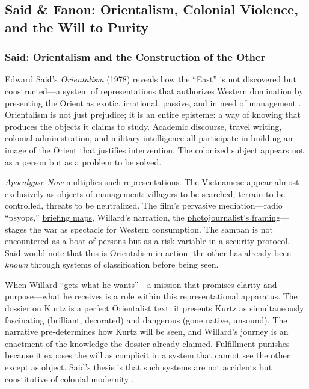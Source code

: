 \subsection*{Said \& Fanon: Orientalism, Colonial Violence, and the Will to Purity}
\label{ssec:v-said-fanon}

\subsubsection*{Said: Orientalism and the Construction of the Other}
Edward Said's \textit{Orientalism} (1978) reveals how the ``East'' is not discovered but
constructed---a system of representations that authorizes Western domination by presenting the
Orient as exotic, irrational, passive, and in need of management \parencite{SaidOrientalism1978}.
Orientalism is not just prejudice; it is an entire episteme: a way of knowing that produces the
objects it claims to study. Academic discourse, travel writing, colonial administration, and
military intelligence all participate in building an image of the Orient that justifies
intervention. The colonized subject appears not as a person but as a problem to be solved.

\textit{Apocalypse Now} multiplies such representations. The Vietnamese appear almost
exclusively as objects of management: villagers to be searched, terrain to be controlled,
threats to be neutralized. The film's pervasive mediation---radio ``psyops,''
\hyperref[scene:briefing]{briefing maps}, Willard's narration, the
\hyperref[scene:kurtz-compound]{photojournalist's framing}---stages the war as spectacle for
Western consumption. The sampan is not encountered as a boat of persons but as a risk variable in a
security protocol. Said would note that this is Orientalism in action: the other has already
been \emph{known} through systems of classification before being seen.

When Willard ``gets what he wants''---a mission that promises clarity and purpose---what he
receives is a role within this representational apparatus. The dossier on Kurtz is a perfect
Orientalist text: it presents Kurtz as simultaneously fascinating (brilliant, decorated) and
dangerous (gone native, unsound). The narrative pre-determines how Kurtz will be seen, and
Willard's journey is an enactment of the knowledge the dossier already claimed. Fulfillment
punishes because it exposes the will as complicit in a system that cannot see the other except
as object. Said's thesis is that such systems are not accidents but constitutive of colonial
modernity \parencite{SaidOrientalism1978}.

